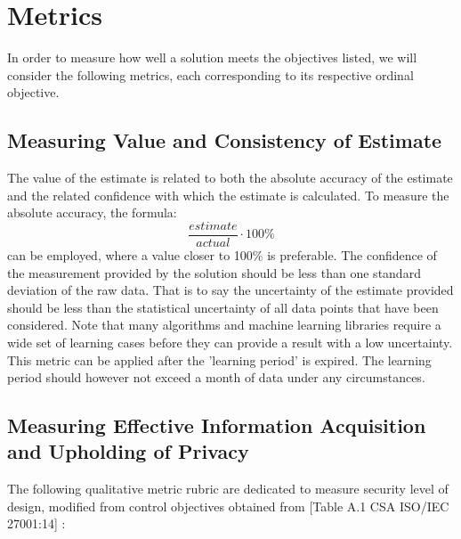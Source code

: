 \documentclass[11pt]{article}
\newenvironment{subs}
  {\adjustwidth{3em}{0pt}}
  {\endadjustwidth}
\begin{document}
\section{Metrics}
    In order to measure how well a solution meets the objectives listed, we will consider the following metrics, each corresponding to its respective ordinal objective. 
    \begin{subs}
        \subsection{Measuring Value and Consistency of Estimate}
        The value of the estimate is related to both the absolute accuracy of the estimate and the related confidence with which the estimate is calculated. To measure the absolute accuracy, the formula:
        \bigskip
        \begin{equation}\tag{1}
            \frac{estimate}{actual}\cdot 100\%
            \label{Effectiveness}
        \end{equation}
        \bigskip
        can be employed, where a value closer to 100$\%$ is preferable. The confidence of the measurement provided by the solution should be less than one standard deviation of the raw data. That is to say the uncertainty of the estimate provided should be less than the statistical uncertainty of all data points that have been considered. Note that many algorithms and machine learning libraries require a wide set of learning cases before they can provide a result with a low uncertainty. This metric can be applied after the 'learning period' is expired. The learning period should however not exceed a month of data under any circumstances. 

    \subsection{Measuring Effective Information Acquisition and Upholding of Privacy}
        The following qualitative metric rubric are dedicated to measure security level of design, modified from control objectives obtained from [Table A.1 CSA ISO/IEC 27001:14] \cite{CSA}:
        

\end{subs}
\end{document}
